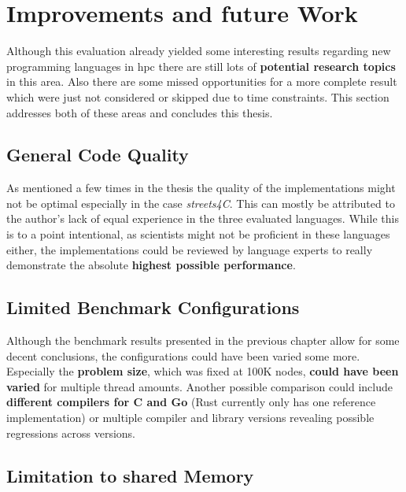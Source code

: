 \section{Improvements and future Work}
\label{sec:Conclusion::Improvements}

Although this evaluation already yielded some interesting results regarding new programming languages in \gls{hpc} there are still lots of \textbf{potential research topics} in this area. Also there are some missed opportunities for a more complete result which were just not considered or skipped due to time constraints. This section addresses both of these areas and concludes this thesis.

\subsection*{General Code Quality}
\label{subsec:Conclusion::Improvements::CodeQuality}

As mentioned a few times in the thesis the quality of the implementations might not be optimal especially in the case \textit{streets4C}. This can mostly be attributed to the author's lack of equal experience in the three evaluated languages. While this is to a point intentional, as scientists might not be proficient in these languages either, the implementations could be reviewed by language experts to really demonstrate the absolute \textbf{highest possible performance}.

\subsection*{Limited Benchmark Configurations}
\label{subsec:Conclusion::Improvements::Configuration}

Although the benchmark results presented in the previous chapter allow for some decent conclusions, the configurations could have been varied some more. Especially the \textbf{problem size}, which was fixed at 100K nodes, \textbf{could have been varied} for multiple thread amounts. Another possible comparison could include \textbf{different compilers for C and Go} (Rust currently only has one reference implementation) or multiple compiler and library versions revealing possible regressions across versions.

\subsection*{Limitation to shared Memory}
\label{subsec:Conclusion::Improvements::SharedMemory}

